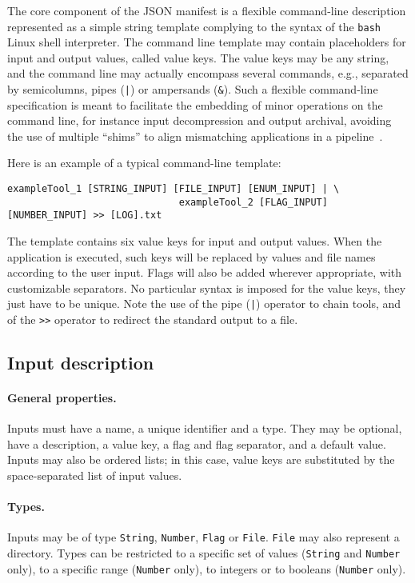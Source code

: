 \documentclass{article}
\begin{document}
The core component of the JSON manifest is a flexible command-line
description represented as a simple string template complying to the
syntax of the \texttt{bash} Linux shell interpreter. The command line
template may contain placeholders for input and output values, called
value keys. The value keys may be any string, and the
command line may actually encompass several commands, e.g., separated
by semicolumns, pipes (\texttt{|}) or ampersands (\texttt{\&}). Such a
flexible command-line specification is meant to facilitate the
embedding of minor operations on the command line, for instance input
decompression and output archival, avoiding the use of multiple
``shims'' to align mismatching applications in a
pipeline~\cite{hull2004treating}.

Here is an example of a typical command-line template:
\begin{verbatim}
exampleTool_1 [STRING_INPUT] [FILE_INPUT] [ENUM_INPUT] | \
                              exampleTool_2 [FLAG_INPUT] [NUMBER_INPUT] >> [LOG].txt
\end{verbatim}
The template contains six value keys for input and output
values. When the application is executed, such keys will be replaced
by values and file names according to the user input. Flags will also
be added wherever appropriate, with customizable separators. No
particular syntax is imposed for the value keys, they just have
to be unique.  Note the use of the pipe (\texttt{|}) operator to chain
tools, and of the \texttt{>>} operator to redirect the standard output
to a file.

\subsection{Input description}

\paragraph{General properties.} Inputs must have a name, a unique
identifier and a type. They may be optional, have a description, a
value key, a flag and flag separator, and a default
value. Inputs may also be ordered lists; in this case, value
keys are substituted by the space-separated list of input values.

\paragraph{Types.} Inputs may be of type \texttt{String},
\texttt{Number}, \texttt{Flag} or \texttt{File}. \texttt{File} may
also represent a directory. Types can be restricted to a specific set
of values (\texttt{String} and \texttt{Number} only), to a specific
range (\texttt{Number} only), to integers or to booleans (\texttt{Number}
only).
\end{document}
